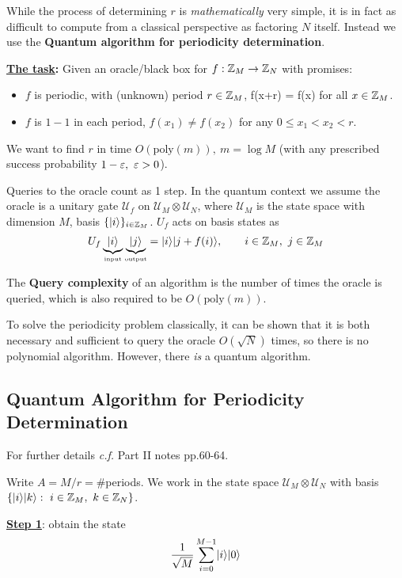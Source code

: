\documentclass[]{article}
\newcommand{\poly}{\textrm{poly}}
\newcommand{\U}{\mathcal{U}}
\begin{document}
While the process of determining $r$ is \textit{mathematically} very simple, it is in fact as difficult to compute from a classical perspective as factoring $N$ itself. Instead we use the \textbf{Quantum algorithm for periodicity determination}.

\textbf{\underline{The task}:} Given an oracle/black box for $f:\mathbb{Z}_M \rightarrow \mathbb{Z}_N$ with promises:
\begin{itemize}
	\item $f$ is periodic, with (unknown) period $r\in \mathbb{Z}_M$, \ie f(x+r) = f(x) for all $x\in \mathbb{Z}_M$.
	\item $f$ is $1-1$ in each period, \ie $f(x_1)\ne f(x_2)$ for any $0\le x_1 < x_2 < r$.
\end{itemize}

We want to find $r$ in time $O(\poly(m)),\ m = \log M$ (with any prescribed success probability $1-\varepsilon,\ \varepsilon > 0$).

\begin{remark*}
	Queries to the oracle count as 1 step. In the quantum context we assume the oracle is a unitary gate $\U_f$ on $\U_M\otimes \U_N$, where $\U_M$ is the state space with dimension $M$, basis $\{ \lvert i\rangle \}_{i\in\mathbb{Z}_M}$. $U_f$ acts on basis states as
	\[
	U_f\underbrace{\lvert i\rangle}_{\textrm{\tiny input}}\underbrace{\lvert j\rangle}_{\textrm{\tiny output}} = \lvert i\rangle\lvert j+f(i)\rangle,\qquad i\in\mathbb{Z}_M,\ j\in\mathbb{Z}_M
	\]
	
	The \textbf{Query complexity} of an algorithm is the number of times the oracle is queried, which is also required to be $O(\poly(m))$.
\end{remark*}

To solve the periodicity problem classically, it can be shown that it is both necessary and sufficient to query the oracle $O(\sqrt{N})$ times, so there is no polynomial algorithm. However, there \textit{is} a quantum algorithm.

\subsection{Quantum Algorithm for Periodicity Determination}

For further details \textit{c.f.} Part II notes pp.60-64.

Write $A = M/r = \#$periods. We work in the state space $\U_M\otimes\U_N$ with basis $\{\ket{i}\ket{k}:\ i\in\Z_M,\ k\in\Z_N\}$.

\underline{\textbf{Step 1}}: obtain the state \[ \frac{1}{\sqrt{M}} \sum_{i=0}^{M-1}\lvert i\rangle\lvert0\rangle\]
\end{document}

